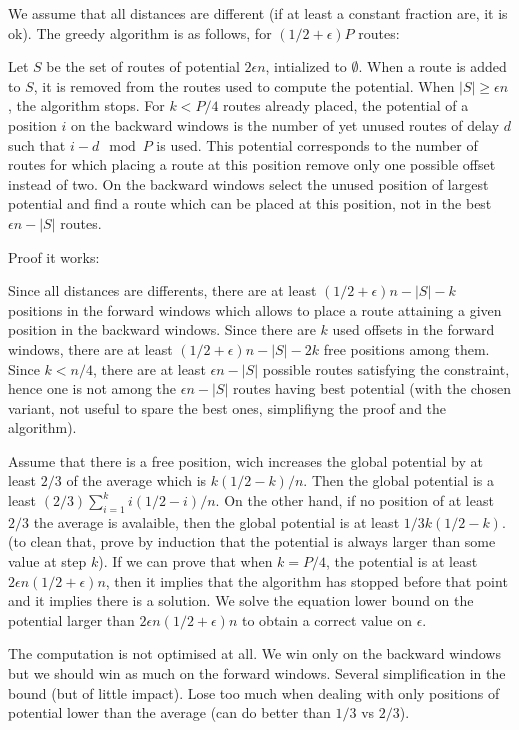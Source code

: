 \documentclass[10pt, conference, letterpaper]{IEEEtran}
\begin{document}
We assume that all distances are different (if at least a constant fraction are, it is ok).
The greedy algorithm is as follows, for $(1/2 + \epsilon)P$ routes:

Let $S$ be the set of routes of potential $2\epsilon n$, intialized to $\emptyset$.
When a route is added to $S$, it is removed from the routes used to compute the potential. 
When $|S| \geq \epsilon n$, the algorithm stops.
For $k < P/4$ routes already placed, the potential of a position $i$ on the backward windows 
is the number of yet unused routes of delay $d$ such that $i-d \mod P$ is used.
This potential corresponds to the number of routes for which placing a route at this position
remove only one possible offset instead of two.
On the backward windows select the unused position of largest potential and find a route which can be 
placed at this position, not in the best $\epsilon n - |S|$ routes.  

Proof it works: 

Since all distances are differents, 
there are at least $(1/2 + \epsilon)n - |S|- k$ positions in the forward windows which allows
to place a route attaining a given position in the backward windows. 
Since there are $k$ used offsets in the forward windows, there are at least $(1/2 + \epsilon)n - |S|- 2k$ free positions among them. Since $k < n/4$, there are at least $\epsilon n - |S|$ possible routes satisfying the constraint, hence one is not among the $\epsilon n - |S|$ routes having best potential
(with the chosen variant, not useful to spare the best ones, simplifiyng the proof and the algorithm).


Assume that there is a free position, wich increases the global potential by at least $2/3$
of the average which is $k(1/2 - k)/n$. Then the global potential is a least $(2/3)\sum_{i=1}^{k}i(1/2 - i)/n$. On the other hand, if no position of at least $2/3$ the average is avalaible, then the global
potential is at least $1/3 k(1/2 - k)$. (to clean that, prove by induction that the potential is always larger than some value at step $k$).
If we can prove that when $k = P/4$, the potential is at least $2\epsilon n (1/2 + \epsilon)n$, then 
it implies that the algorithm has stopped before that point and it implies there is a solution.
We solve the equation lower bound on the potential larger than $2\epsilon n (1/2 + \epsilon)n$
to obtain a correct value on $\epsilon$.



The computation is not optimised at all. We win only on the backward windows but 
we should win as much on the forward windows. Several simplification in the bound (but of little impact).
Lose too much when dealing with only positions of potential lower than the average (can do better than $1/3 $ vs $2/3$).
\end{document}
